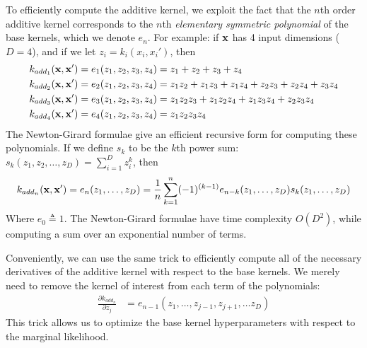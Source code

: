 To efficiently compute the additive kernel, we exploit the fact that the $n$th order additive kernel corresponds to the $n$th \textit{elementary symmetric polynomial} \citep{macdonald1998symmetric}
of the base kernels, which we denote $e_n$.
For example:  if $\bf x$ has 4 input dimensions ($D = 4$), and if we let $z_i = k_i(x_i,x_i')$, then
%
\begin{align}
k_{add_1}({\bf x, x'}) & = e_1( z_1, z_2, z_3, z_4 ) = z_1 + z_2 + z_3 + z_4 \\
k_{add_2}({\bf x, x'}) & = e_2( z_1, z_2, z_3, z_4 ) = z_1 z_2 + z_1 z_3 + z_1z_4 + z_2 z_3 + z_2 z_4 + z_3 z_4 \\
k_{add_3}({\bf x, x'}) & = e_3( z_1, z_2, z_3, z_4 ) = z_1 z_2 z_3 + z_1 z_2 z_4 + z_1 z_3 z_4 + z_2 z_3 z_4 \\
k_{add_4}({\bf x, x'}) & = e_4( z_1, z_2, z_3, z_4 ) = z_1 z_2 z_3 z_4
\end{align}
%
The Newton-Girard formulae give an efficient recursive form for computing these polynomials.
If we define $s_k$ to be the $k$th power sum: $s_k(z_1,z_2,\dots,z_D) = \sum_{i=1}^Dz_i^k$, then
%
\begin{align}
k_{add_n}({\bf x, x'}) = e_n(z_1,\dots,z_D) = \frac{1}{n} \sum_{k=1}^n (-1)^{(k-1)} e_{n-k}(z_1,\dots,z_D)s_k(z_1,\dots,z_D)
\end{align}
%
Where $e_0 \triangleq 1$.  The Newton-Girard formulae have time complexity $O( D^2 )$, while computing a sum over an exponential number of terms.

Conveniently, we can use the same trick to efficiently compute all of the necessary derivatives of the additive kernel with respect to the base kernels.
We merely need to remove the kernel of interest from each term of the polynomials:
%
\begin{align}
\frac{\partial k_{add_n}}{\partial z_j} & = e_{n-1}(z_1,\dots,z_{j-1},z_{j+1}, \dots z_D)
\end{align}
%
This trick allows us to optimize the base kernel hyperparameters with respect to the marginal likelihood.

